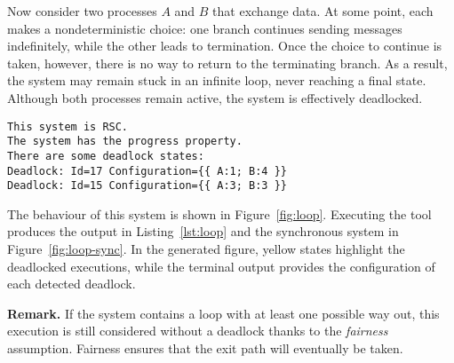 \begin{example}\label{exm:loop}
Now consider two processes $A$ and $B$ that exchange data. At some
point, each makes a nondeterministic choice: one branch continues
sending messages indefinitely, while the other leads to termination.
Once the choice to continue is taken, however, there is no way to
return to the terminating branch. As a result, the system may remain
stuck in an infinite loop, never reaching a final state. Although both
processes remain active, the system is effectively deadlocked.

\bigskip

\begin{lstlisting}[language={},caption={Output of Example~\ref{exm:loop}.},
    label={lst:loop}]
This system is RSC.
The system has the progress property.
There are some deadlock states:
Deadlock: Id=17 Configuration={{ A:1; B:4 }}
Deadlock: Id=15 Configuration={{ A:3; B:3 }}
\end{lstlisting}

The behaviour of this system is shown in Figure~\ref{fig:loop}. 
Executing the tool produces the output in
Listing~\ref{lst:loop} and the synchronous system in
Figure~\ref{fig:loop-sync}. In the
generated figure, yellow states highlight the deadlocked executions,
while the terminal output provides the configuration of each detected
deadlock.

\textbf{Remark.} 
If the system contains a loop with at least one possible way out, this 
execution is still considered without a deadlock thanks to the 
\emph{fairness} assumption. 
Fairness ensures that the exit path will eventually be taken.



\end{example}
